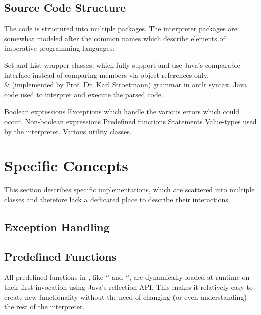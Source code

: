 \subsection{Source Code Structure}\label{srcStructure}

The code is structured into multiple packages. The interpreter packages are somewhat modeled after the common names which describe elements of imperative programming languages:

\begin{itemize}
			{Set and List wrapper classes, which fully support and use Java's comparable interface instead of comparing members via object references only.\\&
			 (implemented by Prof. Dr. Karl Stroetmann)}
			{\SetlX{} grammar in antlr syntax.}
			{Java code used to interpret and execute the parsed \SetlX{} code.}
		\begin{itemize}
				{Boolean expressions}
				{Exceptions which handle the various errors which could occur.}
				{Non-boolean expressions}
				{Predefined functions}
				{Statements}
				{Value-types used by the interpreter.}
				{Various utility classes.}
		\end{itemize}
\end{itemize}

\section{Specific Concepts}\label{specificConcepts}

This section describes specific implementations, which are scattered into multiple classes and therefore lack a dedicated place to describe their interactions.

\subsection{Exception Handling}


\subsection{Predefined Functions}

All predefined functions in \setlX{}, like `' and `', are dynamically loaded at runtime on their first invocation using Java's reflection API. This makes it relatively easy to create new functionality without the need of changing (or even understanding) the rest of the interpreter.

